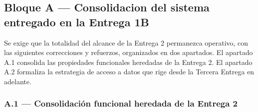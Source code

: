 \documentclass[11pt,a4paper]{article}
\begin{document}
\subsection{Bloque A --- Consolidacion del sistema entregado en la Entrega 1B}

Se exige que la totalidad del alcance de la Entrega 2 permanezca operativo, con las siguientes correcciones y refuerzos, organizados en dos apartados. El apartado A.1 consolida las propiedades funcionales heredadas de la Entrega 2. El apartado A.2 formaliza la estrategia de acceso a datos que rige desde la Tercera Entrega en adelante.

\subsubsection*{A.1 --- Consolidaci\'{o}n funcional heredada de la Entrega 2}
\end{document}
